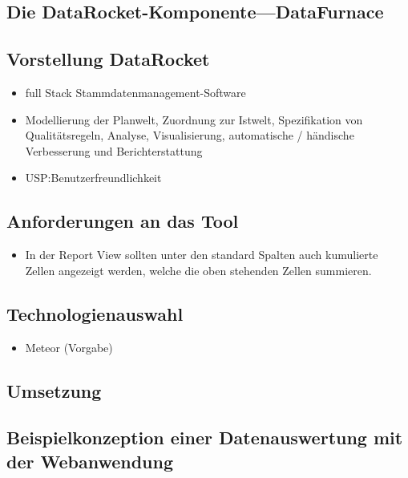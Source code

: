 \documentclass[
  language=german, %
  type=bachelor%
]{isthesis}
\begin{document}
\begin{content}
  \chapter{Die DataRocket-Komponente---DataFurnace}

  \section{Vorstellung DataRocket}
  \begin{itemize}
    \item full Stack Stammdatenmanagement-Software
    \item Modellierung der Planwelt, Zuordnung zur Istwelt, Spezifikation von
      Qualitätsregeln, Analyse, Visualisierung, automatische / händische
      Verbesserung und Berichterstattung
    \item USP:\@ Benutzerfreundlichkeit 
  \end{itemize}


  \section{Anforderungen an das Tool}
  \begin{itemize}
    \item In der Report View sollten unter den standard Spalten auch kumulierte
      Zellen angezeigt werden, welche die oben stehenden Zellen summieren.
  \end{itemize}


  \section{Technologienauswahl}
  \begin{itemize}
    \item Meteor (Vorgabe)
  \end{itemize}

  \section{Umsetzung}

  \section{Beispielkonzeption einer Datenauswertung mit der Webanwendung}



\end{content}
\end{document}
